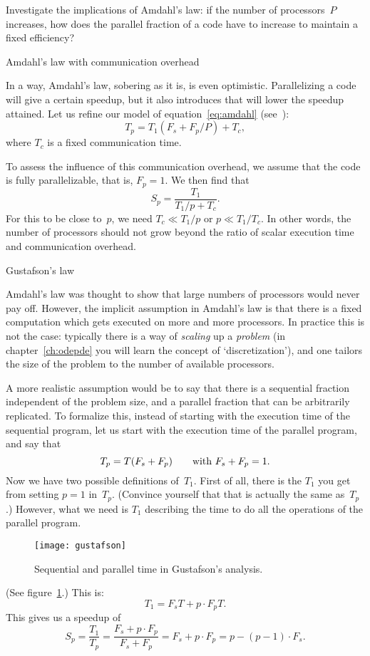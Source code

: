 \begin{exercise}
  \label{ex:amdahl-e}
  Investigate the implications of Amdahl's law: if the number of
  processors~$P$ increases, how does the parallel fraction of a code
  have to increase to maintain a fixed efficiency?
\end{exercise}


 {Amdahl's law with communication overhead}

In a way, Amdahl's law, sobering as it is, is even optimistic.
Parallelizing a code will give a certain speedup, but it also
introduces  that will lower the
speedup attained. Let us refine our model of
equation~\eqref{eq:amdahl} (see~\cite[p.~367]{Landau:comp-phys}):
\[ T_p= T_1(F_s+F_p/P) +T_c, \]
where $T_c$ is a fixed communication time.

To assess the influence of this communication overhead, we assume that
the code is fully parallelizable, that is, $F_p=1$. We then find that
\begin{equation}
    S_p=\frac{T_1}{T_1/p+T_c}.
    \label{eq:amdahl-comm}
\end{equation}
For this to be close to~$p$, we need $T_c\ll T_1/p$ or $p\ll
T_1/T_c$. In other words, the number of processors should not grow
beyond the ratio of scalar execution time and communication overhead.

 {Gustafson's law}

Amdahl's law was thought to show that large numbers of processors
would never pay off. However, the implicit assumption in Amdahl's law
is that there is a fixed computation which gets executed on more and
more processors. In practice this is not the case: typically there is
a way of \emph{scaling} up a \emph{problem}
(in chapter~\ref{ch:odepde} you will
learn the concept of `discretization'), and one
tailors the size of the problem to the number of available processors.

A more realistic assumption would be to say that there is a  sequential
fraction independent of the problem size, and a parallel fraction that
can be arbitrarily replicated.  To formalize this, instead of starting
with the execution time of the sequential program, let us start with
the execution time of the parallel program, and say that
\[ T_p=T(F_s+F_p) \qquad\hbox{with $F_s+F_p=1$}. \]
Now we have two possible definitions of~$T_1$. First of all, there is the $T_1$ 
you get from setting $p=1$ in~$T_p$. (Convince yourself that that is actually 
the same as~$T_p$.) However, what we need is $T_1$ describing the time
to do all the operations of the parallel program.
\begin{figure}[ht]
  \texttt{[image: gustafson]}
  \caption{Sequential and parallel time in Gustafson's analysis.}
  \label{fig:gustafson}
\end{figure}
(See figure~\ref{fig:gustafson}.)
This is:
\[ T_1=F_sT+p\cdot F_pT. \]
This gives us a speedup of
\begin{equation}
  S_p=\frac{T_1}{T_p}=\frac{F_s+p\cdot F_p}{F_s+F_p}
  = F_s+p\cdot F_p = p-(p-1)\cdot F_s. 
  \label{eq:gustaf-s}
\end{equation}


